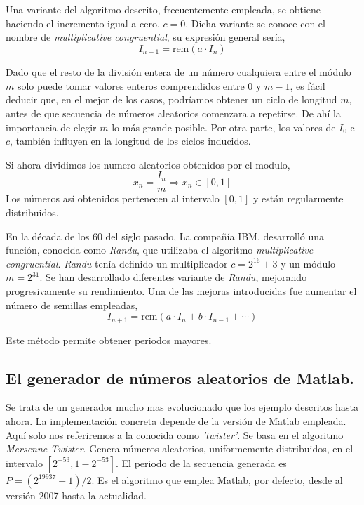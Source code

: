 Una variante del algoritmo descrito, frecuentemente empleada, se obtiene haciendo el incremento igual a cero, $c=0$. Dicha variante se conoce con el nombre de \emph{multiplicative congruential}, su expresión general sería,
\begin{equation*}
I_{n+1}=\text{rem}(a\cdot I_n)
\end{equation*}

Dado que el resto de la división entera de un número cualquiera entre el módulo $m$ solo puede tomar valores enteros comprendidos entre $0$ y $m-1$, es fácil deducir que, en el mejor de los casos, podríamos obtener un ciclo de longitud $m$, antes de que secuencia de números aleatorios comenzara a repetirse. De ahí la importancia de elegir $m$ lo más grande posible. Por otra parte, los valores de $I_0$ e $c$, también influyen en la longitud de los ciclos inducidos.

Si ahora dividimos los numero aleatorios obtenidos por el modulo,  
\begin{equation*}
x_n=\frac{I_n}{m} \Rightarrow x_n \in [0,1]
\end{equation*}
Los números así obtenidos pertenecen al intervalo $[0,1]$ y están regularmente distribuidos. 

En la década de los 60 del siglo pasado, La compañía IBM, desarrolló una función, conocida como \emph{Randu}, que utilizaba el algoritmo \emph{multiplicative congruential}. \emph{Randu} tenía definido un multiplicador $c=2^{16}+3$ y un módulo $m=2^{31}$. 
Se han desarrollado diferentes variante de \emph{Randu}, mejorando progresivamente su rendimiento. Una de las mejoras introducidas fue aumentar el número de semillas empleadas,
\begin{equation*}
I_{n+1}=\text{rem}(a\cdot I_n+b\cdot I_{n-1}+\cdots)
\end{equation*} 

Este método permite obtener periodos mayores.

\subsection{El generador de números aleatorios de Matlab.}\label{rand} Se trata de un generador mucho mas evolucionado que los ejemplo descritos hasta ahora.  La implementación concreta depende de la versión de Matlab empleada. Aquí solo nos referiremos a la conocida como \emph{'twister'}. Se basa en el algoritmo \emph{Mersenne Twister}. Genera números aleatorios, uniformemente distribuidos, en el intervalo $[2^{-53}, 1-2^{-53}] $. El periodo de la secuencia generada es $P=(2^{19937}-1)/2$. Es el algoritmo que emplea Matlab, por defecto, desde al versión 2007 hasta la actualidad.


